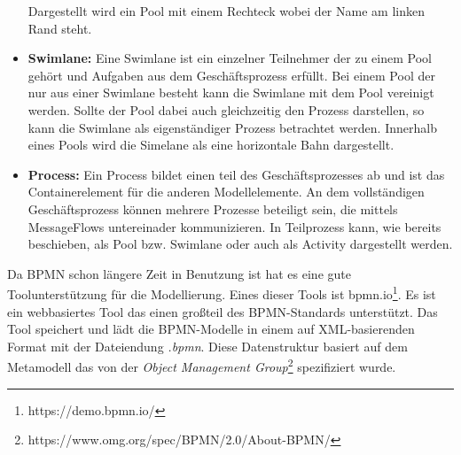 \begin{itemize}
    Dargestellt wird ein Pool mit einem Rechteck wobei der Name am linken Rand steht.
    \item \textbf{Swimlane:}
    Eine Swimlane ist ein einzelner Teilnehmer der zu einem Pool gehört und Aufgaben aus dem Geschäftsprozess erfüllt.
    Bei einem Pool der nur aus einer Swimlane besteht kann die Swimlane mit dem Pool vereinigt werden.
    Sollte der Pool dabei auch gleichzeitig den Prozess darstellen, so kann die Swimlane als eigenständiger Prozess betrachtet werden.
    Innerhalb eines Pools wird die Simelane als eine horizontale Bahn dargestellt.
    \item \textbf{Process:}
    Ein Process bildet einen teil des Geschäftsprozesses ab und ist das Containerelement für die anderen Modellelemente.
    An dem vollständigen Geschäftsprozess können mehrere Prozesse beteiligt sein, die mittels MessageFlows untereinader kommunizieren.
    In Teilprozess kann, wie bereits beschieben, als Pool bzw. Swimlane oder auch als Activity dargestellt werden.
\end{itemize}

Da BPMN schon längere Zeit in Benutzung ist hat es eine gute Toolunterstützung für die Modellierung.
Eines dieser Tools ist bpmn.io\footnote{https://demo.bpmn.io/}.
Es ist ein webbasiertes Tool das einen großteil des BPMN-Standards unterstützt.
Das Tool speichert und lädt die BPMN-Modelle in einem auf XML-basierenden Format mit der Dateiendung \emph{.bpmn}.
Diese Datenstruktur basiert auf dem Metamodell das von der \emph{Object Management Group}\footnote{https://www.omg.org/spec/BPMN/2.0/About-BPMN/} spezifiziert wurde.

